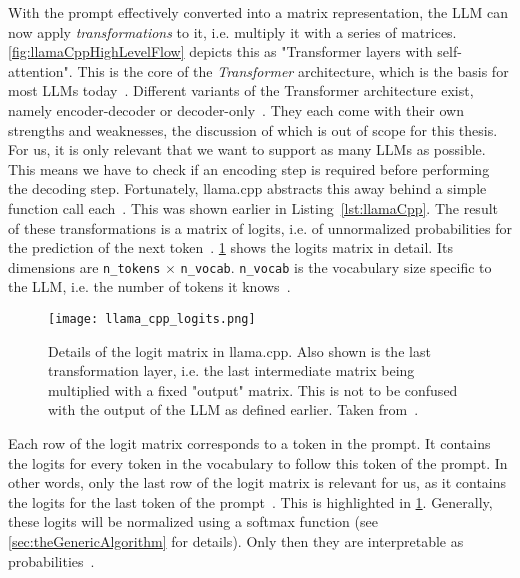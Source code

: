 With the prompt effectively converted into a matrix representation, the \gls{LLM} can now apply \textit{transformations} to it, i.e. multiply it with a series of matrices. \cref{fig:llamaCppHighLevelFlow} depicts this as "Transformer layers with self-attention". This is the core of the \textit{Transformer} architecture, which is the basis for most \glspl{LLM} today~\cite{vaswaniAttentionAllYou2023}. Different variants of the Transformer architecture exist, namely encoder-decoder or decoder-only~\cite{mallisUnderstandingHowLLM2023}. They each come with their own strengths and weaknesses, the discussion of which is out of scope for this thesis. For us, it is only relevant that we want to support as many \glspl{LLM} as possible. This means we have to check if an encoding step is required before performing the decoding step. Fortunately, llama.cpp abstracts this away behind a simple function call each~\cite{gerganovGgerganovLlamacpp2024}. This was shown earlier in Listing~\ref{lst:llamaCpp}. The result of these transformations is a matrix of logits, i.e. of unnormalized probabilities for the prediction of the next token~\cite{mallisUnderstandingHowLLM2023}. \cref{fig:llamaCppLogits} shows the logits matrix in detail. Its dimensions are \lstinline|n_tokens| $\times$ \lstinline|n_vocab|. \lstinline|n_vocab| is the vocabulary size specific to the \gls{LLM}, i.e. the number of tokens it knows~\cite{mallisUnderstandingHowLLM2023}.

\begin{figure}
    \begin{wide}
        \captionsetup{width=\linewidth}
        \texttt{[image: llama\_cpp\_logits.png]}
        \caption[llama.cpp: Logit matrix]{Details of the logit matrix in llama.cpp. Also shown is the last transformation layer, i.e. the last intermediate matrix being multiplied with a fixed "output" matrix. This is not to be confused with the output of the \gls{LLM} as defined earlier. Taken from~\cite{mallisUnderstandingHowLLM2023}.}
        \label{fig:llamaCppLogits}
    \end{wide}
\end{figure}

Each row of the logit matrix corresponds to a token in the prompt. It contains the logits for every token in the vocabulary to follow this token of the prompt. In other words, only the last row of the logit matrix is relevant for us, as it contains the logits for the last token of the prompt~\cite{mallisUnderstandingHowLLM2023}. This is highlighted in \cref{fig:llamaCppLogits}. Generally, these logits will be normalized using a softmax function (see \cref{sec:theGenericAlgorithm} for details). Only then they are interpretable as probabilities~\cite{mallisUnderstandingHowLLM2023,turnerIntroductionTransformers2024}.

